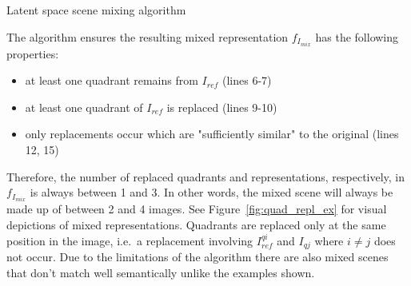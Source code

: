 \documentclass[a4paper,12pt]{report}
\begin{document}
\begin{algorithm}[H]
\DontPrintSemicolon
\LinesNumbered
{}
\caption{Latent space scene mixing algorithm}\label{alg:img_mixing_algo}
\end{algorithm}

The algorithm ensures the resulting mixed representation $f_{I_{mix}}$ has the following properties:
\begin{itemize}
   \item at least one quadrant remains from $I_{ref}$ (lines 6-7)
   \item at least one quadrant of $I_{ref}$ is replaced (lines 9-10)
   \item only replacements occur which are "sufficiently similar" to the original (lines 12, 15)
\end{itemize}
Therefore, the number of replaced quadrants and representations, respectively, in $f_{I_{mix}}$ is always between 1 and 3. In other words, the mixed scene will always be made up of between 2 and 4 images. See Figure~\ref{fig:quad_repl_ex} for visual depictions of mixed representations. Quadrants are replaced only at the same position in the image, i.e.\ a replacement involving $I^{qi}_{ref}$ and $I_{qj}$ where $i \neq j$ does not occur. Due to the limitations of the algorithm there are also mixed scenes that don't match well semantically unlike the examples shown.



\end{document}
